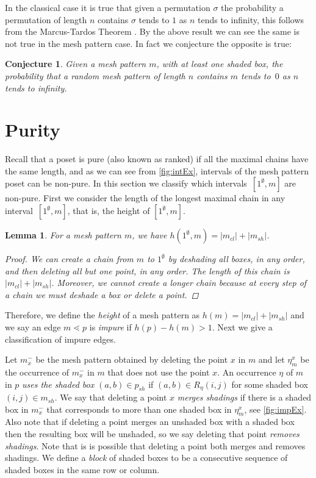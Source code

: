 \documentclass[preprint,11pt]{elsarticle}
\newtheorem{lem}[thm]{Lemma}\crefname{lem}{Lemma}{Lemmas}
\newtheorem{conj}[thm]{Conjecture}\crefname{conj}{Conjecture}{Conjectures}
\newcommand\cl[1]{#1_{cl}}
\newcommand\sh[1]{#1_{sh}}
\newcommand\occX[2]{\eta^{#2}_{#1}}
\newcommand\mX[2]{#1^{-}_{#2}}
\newcommand\h{h}
\numberwithin{equation}{section}
\numberwithin{figure}{section}
\numberwithin{thm}{section}
\begin{document}
In the classical case it is true that given a permutation $\sigma$ the
probability a permutation of length $n$ contains $\sigma$ tends to $1$ as $n$
tends to infinity, this follows from the Marcus-Tardos Theorem \cite{MT04}. By
the above result we can see the same is not true in the mesh pattern case. In
fact we conjecture the opposite is true:

\begin{conj}
Given a mesh pattern $m$, with at least one shaded box, the probability that a random mesh pattern of length
$n$ contains $m$ tends to~$0$ as $n$ tends to infinity.
\end{conj}




\section{Purity}\label{sec:purity}
Recall that a poset is pure (also known as ranked) if all the maximal chains have the same length, and as we
can see from \cref{fig:intEx}, intervals of the mesh pattern poset can be non-pure. In this section we classify
which intervals~$[1^\emptyset,m]$ are non-pure. First we consider the length of the longest maximal chain in
any interval~$[1^\emptyset,m]$, that is, the height of $[1^\emptyset,m]$.

\begin{lem}
For a mesh pattern $m$, we have $\h(1^\emptyset,m)=|\cl{m}|+|\sh{m}|$.
\begin{proof}
We can create a chain from $m$ to $1^\emptyset$ by deshading all boxes, in any order,
and then deleting all but one point, in any order. The length of this chain is $|\cl{m}|+|\sh{m}|$.
Moreover, we cannot create a longer chain because at every
step of a chain we must deshade a box or delete a point.
\end{proof}
\end{lem}

Therefore, we define the \emph{height} of a mesh pattern as $\h(m)=|\cl{m}|+|\sh{m}|$ and we say an
edge $m\lessdot p$ is \emph{impure} if $\h(p)-\h(m)>1$.
Next we give a classification of impure edges.

 Let $\mX{m}{x}$ be the mesh pattern obtained by deleting the
point $x$ in $m$ and let $\occX{m}{x}$ be the occurrence of $\mX{m}{x}$ in $m$ that does not
use the point $x$. An occurrence $\eta$ of $m$ in $p$ \emph{uses the shaded box $(a,b)\in\sh{p}$}
if $(a,b)\in R_\eta(i,j)$ for some shaded box $(i,j)\in\sh{m}$. We say that
deleting a point $x$ \emph{merges shadings} if
there is a shaded box in $\mX{m}{x}$ that corresponds to more than one shaded box in
$\occX{m}{x}$, see \cref{fig:impEx}. Also note that if deleting a point merges an unshaded box with a
shaded box then the resulting box will be unshaded, so we say deleting that point \emph{removes shadings}.
Note that is is possible that deleting a point both merges and removes shadings.
We define a \emph{block} of shaded boxes to be a consecutive sequence of shaded boxes in the same row or column.
\end{document}
